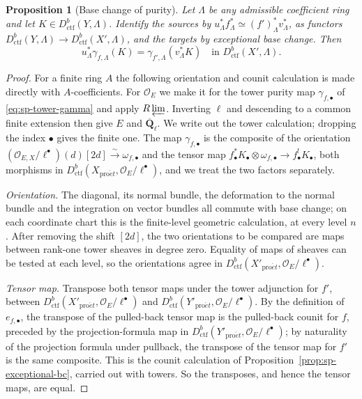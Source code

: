 \documentclass[11pt,a4paper]{article}
\numberwithin{equation}{section}
\newtheorem{proposition}[theorem]{Proposition}
\theoremstyle{definition}
\theoremstyle{remark}
\newcommand{\Qbar}{\overline{\mathbf Q}_\ell}
\newcommand{\proet}{\mathrm{pro}\acute{e}t}
\newcommand{\Dctf}{D^b_{\mathrm{ctf}}}
\begin{document}
\begin{proposition}[Base change of purity]\label{prop:sp-purity-bc}
Let $\Lambda$ be any admissible coefficient ring and let
$K\in\Dctf(Y,\Lambda)$. Identify the sources by
$u_\Lambda^{*}f_\Lambda^{*}\simeq(f')_\Lambda^{*}v_\Lambda^{*}$, as functors
$\Dctf(Y,\Lambda)\to\Dctf(X',\Lambda)$,
and the targets by exceptional base change. Then
\[
 u_\Lambda^{*}\gamma_{f,\Lambda}(K)
 =\gamma_{f',\Lambda}(v_\Lambda^{*}K)
 \quad\text{in }\Dctf(X',\Lambda).
\]
\end{proposition}
\begin{proof}
For a finite ring $A$ the following orientation and counit
calculation is made directly with $A$-coefficients. For $\mathcal O_E$
we make it for the tower purity map $\gamma_{f,\bullet}$ of
\eqref{eq:sp-tower-gamma} and apply $R\varprojlim$. Inverting $\ell$
and descending to a common finite extension then give $E$ and $\Qbar$.
We write out the tower calculation; dropping the index $\bullet$ gives
the finite one. The map $\gamma_{f,\bullet}$ is the composite of
the orientation
$(\mathcal O_{E,X}/\ell^\bullet)(d)[2d]\xrightarrow{\sim}\omega_{f,\bullet}$
and the tensor map
$f_\bullet^*K_\bullet\otimes\omega_{f,\bullet}\to f_\bullet^!K_\bullet$,
both morphisms in $\Dctf(X_{\proet},\mathcal O_E/\ell^\bullet)$,
and we treat the two factors separately.

\emph{Orientation.} The diagonal, its normal bundle, the deformation to
the normal bundle and the integration on vector bundles all commute
with base change; on each coordinate chart this is the finite-level
geometric calculation, at every level $n$. After removing the shift
$[2d]$, the two orientations to be compared are maps between rank-one
tower sheaves in degree zero. Equality of maps of sheaves can be tested
at each level, so the orientations agree in $\Dctf(X'_{\proet},\mathcal O_E/\ell^\bullet)$.

\emph{Tensor map.} Transpose both tensor maps under the tower adjunction
for $f'$, between $\Dctf(X'_{\proet},\mathcal O_E/\ell^\bullet)$ and
$\Dctf(Y'_{\proet},\mathcal O_E/\ell^\bullet)$. By the definition of $e_{f,\bullet}$, the transpose of the
pulled-back tensor map is the pulled-back counit for $f$, preceded by
the projection-formula map in $\Dctf(Y'_{\proet},\mathcal O_E/\ell^\bullet)$; by naturality of the projection formula
under pullback, the transpose of the tensor map for $f'$ is the same
composite. This is the counit calculation of
Proposition~\ref{prop:sp-exceptional-bc}, carried out with towers. So
the transposes, and hence the tensor maps, are equal.
\end{proof}
\end{document}

